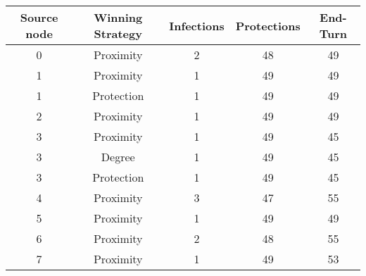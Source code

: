 \documentclass[results.tex]{subfiles}
\begin{document}
    \begin{center}
        \begin{tabular}{| c || c | c | c | c |}
            \hline
            {\bfseries Source node} & {\bfseries Winning Strategy} & {\bfseries Infections} & {\bfseries Protections}
            & {\bfseries End-Turn}
            \\  %
            \hline\hline
            0                       & Proximity                    & 2                      & 48                      & 49                   \\
            \hline
            1                       & Proximity                    & 1                      & 49                      & 49                   \\
            \hline
            1                       & Protection                   & 1                      & 49                      & 49                   \\
            \hline
            2                       & Proximity                    & 1                      & 49                      & 49                   \\
            \hline
            3                       & Proximity                    & 1                      & 49                      & 45                   \\
            \hline
            3                       & Degree                       & 1                      & 49                      & 45                   \\
            \hline
            3                       & Protection                   & 1                      & 49                      & 45                   \\
            \hline
            4                       & Proximity                    & 3                      & 47                      & 55                   \\
            \hline
            5                       & Proximity                    & 1                      & 49                      & 49                   \\
            \hline
            6                       & Proximity                    & 2                      & 48                      & 55                   \\
            \hline
            7                       & Proximity                    & 1                      & 49                      & 53                   \\

\end{tabular}
\end{center}
\end{document}
